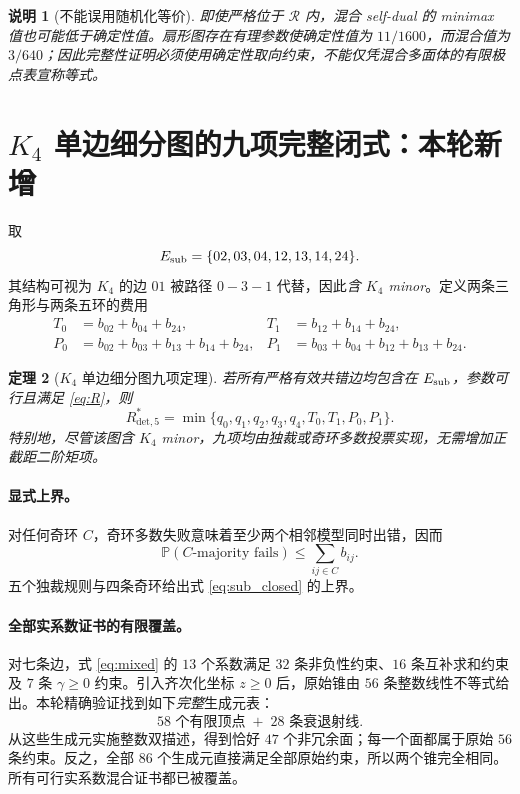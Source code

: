 \documentclass[UTF8,11pt,a4paper]{ctexart}
\newtheorem{theorem}{定理}[section]
\newtheorem{remark}[theorem]{说明}
\newcommand{\Rd}{R_{\mathrm{det},5}^*}
\newcommand{\calR}{\mathcal{R}}
\begin{document}
\begin{remark}[不能误用随机化等价]
即使严格位于 $\calR$ 内，混合 self-dual 的 minimax 值也可能低于确定性值。扇形图存在有理参数使确定性值为 $11/1600$，而混合值为 $3/640$；因此完整性证明\emph{必须}使用确定性取向约束，不能仅凭混合多面体的有限极点表宣称等式。
\end{remark}

\section{$K_4$ 单边细分图的九项完整闭式：本轮新增}
取
\begin{equation}\label{eq:subdiv}
 E_{\rm sub}=\{02,03,04,12,13,14,24\}.
\end{equation}
其结构可视为 $K_4$ 的边 $01$ 被路径 $0-3-1$ 代替，因此\emph{含 $K_4$ minor}。定义两条三角形与两条五环的费用
\begin{align}\label{eq:cycles}
 T_0&=b_{02}+b_{04}+b_{24},&T_1&=b_{12}+b_{14}+b_{24},\\
 P_0&=b_{02}+b_{03}+b_{13}+b_{14}+b_{24},&
 P_1&=b_{03}+b_{04}+b_{12}+b_{13}+b_{24}.
\end{align}

\begin{theorem}[$K_4$ 单边细分图九项定理]\label{thm:subdiv}
若所有严格有效共错边均包含在 $E_{\rm sub}$，参数可行且满足 \eqref{eq:R}，则
\begin{equation}\label{eq:sub_closed}
\boxed{\Rd=\min\{q_0,q_1,q_2,q_3,q_4,T_0,T_1,P_0,P_1\}.}
\end{equation}
特别地，尽管该图含 $K_4$ minor，九项均由独裁或奇环多数投票实现，无需增加正截距二阶矩项。
\end{theorem}

\paragraph{显式上界。}
对任何奇环 $C$，奇环多数失败意味着至少两个相邻模型同时出错，因而
\[
 \mathbb P(\text{$C$-majority fails})\le\sum_{ij\in C}b_{ij}.
\]
五个独裁规则与四条奇环给出式 \eqref{eq:sub_closed} 的上界。

\paragraph{全部实系数证书的有限覆盖。}
对七条边，式 \eqref{eq:mixed} 的 $13$ 个系数满足 $32$ 条非负性约束、$16$ 条互补求和约束及 $7$ 条 $\gamma\ge0$ 约束。引入齐次化坐标 $z\ge0$ 后，原始锥由 $56$ 条整数线性不等式给出。本轮精确验证找到如下\emph{完整}生成元表：
\[
 \boxed{58\text{ 个有限顶点}\; +\;28\text{ 条衰退射线}.}
\]
从这些生成元实施整数双描述，得到恰好 $47$ 个非冗余面；每一个面都属于原始 $56$ 条约束。反之，全部 $86$ 个生成元直接满足全部原始约束，所以两个锥完全相同。所有可行实系数混合证书都已被覆盖。
\end{document}
